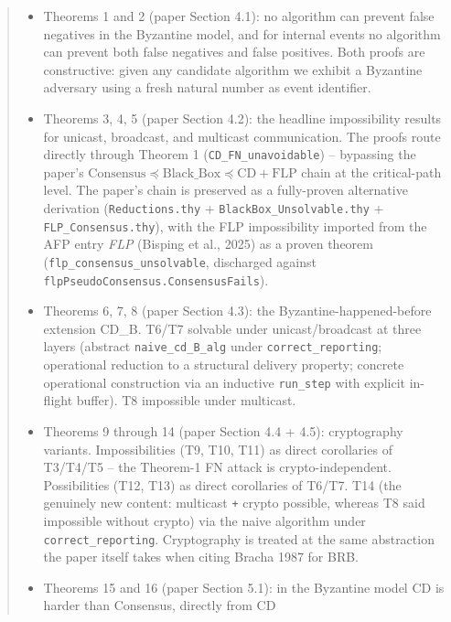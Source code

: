 \documentclass[11pt,a4paper]{article}
\begin{document}
\begin{abstract}
\begin{itemize}
  \item Theorems 1 and 2 (paper Section 4.1): no algorithm can
        prevent false negatives in the Byzantine model, and for
        internal events no algorithm can prevent both false
        negatives and false positives.  Both proofs are
        constructive: given any candidate algorithm we exhibit a
        Byzantine adversary using a fresh natural number as event
        identifier.
  \item Theorems 3, 4, 5 (paper Section 4.2): the headline
        impossibility results for unicast, broadcast, and
        multicast communication.  The proofs route directly
        through Theorem 1 (\verb|CD_FN_unavoidable|) -- bypassing
        the paper's $\mathrm{Consensus} \preceq \mathrm{Black\_Box}
        \preceq \mathrm{CD} + \mathrm{FLP}$ chain at the
        critical-path level.  The paper's chain is preserved as a
        fully-proven alternative derivation
        (\verb|Reductions.thy| + \verb|BlackBox_Unsolvable.thy| +
        \verb|FLP_Consensus.thy|), with the FLP impossibility
        imported from the AFP entry \emph{FLP}
        (Bisping et al., 2025) as a proven theorem
        (\verb|flp_consensus_unsolvable|, discharged against
        \verb|flpPseudoConsensus.ConsensusFails|).
  \item Theorems 6, 7, 8 (paper Section 4.3): the
        Byzantine-happened-before extension CD\_B.  T6/T7
        solvable under unicast/broadcast at three layers (abstract
        \verb|naive_cd_B_alg| under \verb|correct_reporting|;
        operational reduction to a structural delivery property;
        concrete operational construction via an inductive
        \verb|run_step| with explicit in-flight buffer).  T8
        impossible under multicast.
  \item Theorems 9 through 14 (paper Section 4.4 + 4.5):
        cryptography variants.  Impossibilities (T9, T10, T11)
        as direct corollaries of T3/T4/T5 -- the Theorem-1 FN
        attack is crypto-independent.  Possibilities (T12, T13)
        as direct corollaries of T6/T7.  T14 (the genuinely new
        content: multicast \verb|+| crypto possible, whereas T8
        said impossible without crypto) via the naive algorithm
        under \verb|correct_reporting|.  Cryptography is treated
        at the same abstraction the paper itself takes when
        citing Bracha 1987 for BRB.
  \item Theorems 15 and 16 (paper Section 5.1): in the Byzantine
        model CD is harder than Consensus, directly from CD

\end{itemize}
\end{abstract}
\end{document}
